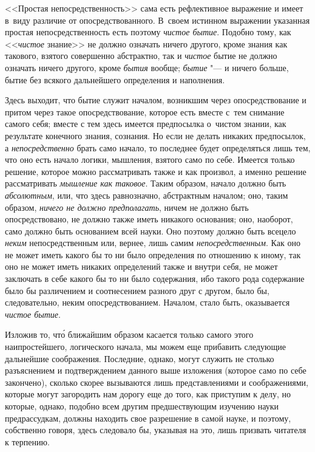 <<Простая непосредственность>> сама есть рефлективное выражение и имеет в~виду
различие от опосредствованного. В~своем истинном выражении указанная простая
непосредственность есть поэтому {\em чистое бытие}. Подобно тому, как
<<{\em чистое} знание>> не должно означать ничего другого, кроме знания как
такового, взятого совершенно абстрактно, так и {\em чистое} бытие не должно
означать ничего другого, кроме {\em бытия} вообще; {\em бытие} "--- и ничего
больше, бытие без всякого дальнейшего определения и наполнения.

Здесь выходит, что бытие служит началом, возникшим через опосредствование и
притом через такое опосредствование, которое есть вместе с~тем снимание
самого себя; вместе с тем здесь имеется предпосылка о~чистом знании, как
результате конечного знания, сознания. Но если не делать никаких
предпосылок, а {\em непосредственно} брать само начало,
то последнее будет определяться лишь тем, что оно есть начало логики,
мышления, взятого само по себе. Имеется только решение, которое можно
рассматривать также и как произвол, а именно решение рассматривать
{\em мышление как таковое}. Таким образом, начало должно
быть {\em абсолютным}, или, что здесь равнозначно,
абстрактным началом; оно, таким образом, {\em ничего не должно предполагать},
ничем не должно быть опосредствовано, не должно также
иметь никакого основания; оно, наоборот, само должно быть основанием всей
науки. Оно поэтому должно быть всецело {\em неким} непосредственным или,
вернее, лишь самим {\em непосредственным}. Как оно не может иметь какого
бы то ни было определения по отношению к иному, так оно не может иметь
никаких определений также и внутри себя, не может заключать в себе какого
бы то ни было содержания, ибо такого рода содержание было бы различением и
соотнесением разного друг с другом, было бы, следовательно, неким
опосредствованием. Началом, стало быть, оказывается {\em чистое бытие}.

Изложив то, чт\'{о} ближайшим образом касается только самого этого
наипростейшего, логического начала, мы можем еще прибавить следующие дальнейшие
соображения. Последние, однако, могут служить не столько разъяснением и
подтверждением данного выше изложения (которое само по себе закончено), сколько
скорее вызываются лишь представлениями и соображениями, которые могут
загородить нам дорогу еще до того, как приступим к делу, но которые, однако,
подобно всем другим предшествующим изучению науки предрассудкам, должны
находить свое разрешение в самой науке, и поэтому, собственно говоря, здесь
следовало бы, указывая на это, лишь призвать читателя к терпению.

